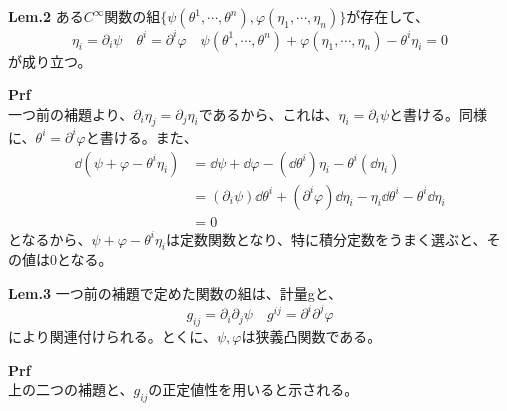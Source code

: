 \documentclass[a4paper,11pt]{jsarticle}
\numberwithin{equation}{section}
\begin{document}
    
    \begin{itembox}[l]{\textbf{Lem.2}}
        ある$C^{\infty}$関数の組$\{\psi(\theta^1,\cdots,\theta^n),\varphi(\eta_1,\cdots,\eta_n)\}$が存在して、
        \begin{equation}
            \eta_i = \partial_i \psi \quad \theta^i = \partial^i \varphi \quad \psi(\theta^1,\cdots,\theta^n) + \varphi(\eta_1,\cdots,\eta_n) - \theta^i\eta_i = 0
        \end{equation}
        が成り立つ。
    \end{itembox}
    \textbf{Prf}\\
    一つ前の補題より、$\partial_i \eta_j = \partial_j \eta_i$であるから、これは、$\eta_i = \partial_i \psi$と書ける。同様に、$\theta^i = \partial^i \varphi$と書ける。また、
    \begin{align}
        \dd (\psi + \varphi - \theta^i\eta_i) &= \dd \psi + \dd \varphi - (\dd \theta^i)\eta_i - \theta^i(\dd \eta_i) \\
        &=(\partial_i \psi )\dd \theta^i + (\partial^i \varphi)\dd \eta_i - \eta_i \dd \theta^i - \theta^i \dd \eta_i \\
        &=0
    \end{align}
    となるから、$\psi + \varphi - \theta^i\eta_i$は定数関数となり、特に積分定数をうまく選ぶと、その値は0となる。\hfill\qedsymbol
    
    \begin{itembox}[l]{\textbf{Lem.3}}
        一つ前の補題で定めた関数の組は、計量gと、
        \begin{equation}
            g_{ij} = \partial_i \partial_j \psi \quad g^{ij} = \partial^i \partial^j \varphi
        \end{equation}
        により関連付けられる。とくに、$\psi,\varphi$は狭義凸関数である。
    \end{itembox}
    \textbf{Prf}\\
    上の二つの補題と、$g_{ij}$の正定値性を用いると示される。\hfill\qedsymbol
    
\end{document}
